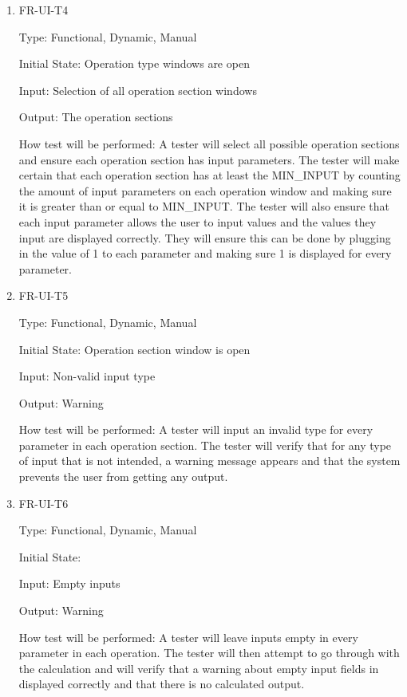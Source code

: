 \documentclass[12pt, titlepage]{article}
\begin{document}
\begin{enumerate}
\item{FR-UI-T4\\}

Type: Functional, Dynamic, Manual
					
Initial State: Operation type windows are open
					
Input: Selection of all operation section windows
					
Output: The operation sections
					
How test will be performed: A tester will select all possible operation sections and ensure each operation section has input parameters. The tester will make certain that each operation section has at least the MIN\_INPUT by counting the amount of input parameters on each operation window and making sure it is greater than or equal to MIN\_INPUT. The tester will also ensure that each input parameter allows the user to input values and the values they input are displayed correctly. They will ensure this can be done by plugging in the value of 1 to each parameter and making sure 1 is displayed for every parameter.





\item{FR-UI-T5\\}

Type: Functional, Dynamic, Manual
					
Initial State: Operation section window is open 
					
Input: Non-valid input type
					
Output: Warning

How test will be performed: A tester will input an invalid type for every parameter in each operation section. The tester will verify that for any type of input that is not intended, a warning message appears and that the system prevents the user from getting any output.


\item{FR-UI-T6\\}

Type: Functional, Dynamic, Manual
					
Initial State: 
					
Input: Empty inputs
					
Output: Warning

How test will be performed: A tester will leave inputs empty in every parameter in each operation. The tester will then attempt to go through with the calculation and will verify that a warning about empty input fields in displayed correctly and that there is no calculated output.






\end{enumerate}
\end{document}
